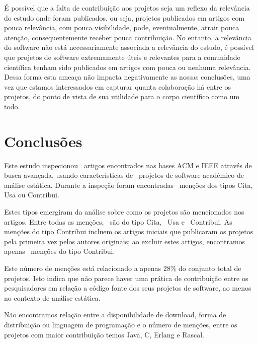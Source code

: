 É possível que a falta de contribuição aos projetos seja um reflexo da
relevância do estudo onde foram publicados, ou seja, projetos publicados em
artigos com pouca relevância, com pouca visibilidade, pode, eventualmente,
atrair pouca atenção, consequentemente receber pouca contribuição. No entanto,
a relevância do software não está necessariamente associada a relevância do
estudo, é possível que projetos de software extremamente úteis e relevantes
para a comunidade científica tenham sido publicados em artigos com pouca ou
nenhuma relevância. Dessa forma esta ameaça não impacta negativamente as nossas
conclusões, uma vez que estamos interessados em capturar quanta colaboração há
entre os projetos, do ponto de vista de sua utilidade para o corpo científico
como um todo.


\section{Conclusões} \label{estudo2:conclusoes} %

Este estudo inspecionou \SearchUniqueCount \ artigos encontrados nas bases ACM
e IEEE através de busca avançada, usando características de \SoftwareCount \
projetos de software acadêmico de análise estática. Durante a inspeção foram
encontradas \ScreeningCount \ menções dos tipos Cita, Usa ou
Contribui.

Estes tipos emergiram da análise sobre como os projetos são mencionados nos
artigos. Entre todas as menções, \CiteCount \ são do tipo Cita, \UseCount \ Usa
e \ContributeCount \ Contribui. As menções do tipo Contribui incluem os artigos
iniciais que publicaram os projetos pela primeira vez pelos autores originais;
ao excluir estes artigos, encontramos apenas \ContributeStudyDoisCount \ menções
do tipo Contribui.

Este número de menções está relacionado a apenas 28\% do conjunto total de
projetos. Isto indica que não parece haver uma prática de contribuição entre os
pesquisadores em relação a código fonte dos seus projetos de software, ao menos
no contexto de análise estática.


Não encontramos relação entre a disponibilidade de download, forma de
distribuição ou linguagem de programação e o número de menções, entre os
projetos com maior contribuição temos Java, C, Erlang e Rascal.

